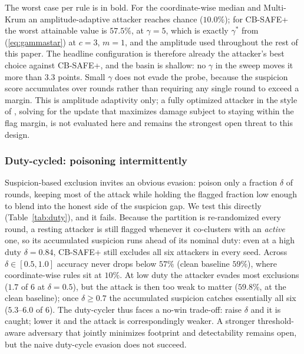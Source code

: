\documentclass[lettersize,journal]{IEEEtran}
\begin{document}
\noindent The worst case per rule is in bold. For the coordinate-wise median and
Multi-Krum an amplitude-adaptive attacker reaches chance ($10.0\%$); for CB-SAFE+ the
worst attainable value is $57.5\%$, at $\gamma{=}5$, which is exactly $\gamma^{*}$ from (\ref{eq:gammastar}) at $c{=}3$, $m{=}1$, and the amplitude used throughout
the rest of this paper. The headline configuration is therefore already the
attacker's best choice against CB-SAFE+, and the basin is shallow: no $\gamma$ in the
sweep moves it more than $3.3$ points. Small $\gamma$ does not evade the probe,
because the suspicion score accumulates over rounds rather than requiring any single
round to exceed a margin. This is amplitude adaptivity only; a fully optimized
attacker in the style of \cite{fang2020,shejwalkar2021,baruch2019}, solving for the
update that maximizes damage subject to staying within the flag margin, is not
evaluated here and remains the strongest open threat to this design.

\subsubsection{Duty-cycled: poisoning intermittently}
Suspicion-based exclusion invites an obvious evasion: poison only a fraction
$\delta$ of rounds, keeping most of the attack while holding the flagged fraction low
enough to blend into the honest side of the suspicion gap. We test this directly
(Table~\ref{tab:duty}), and it fails.
Because the partition is re-randomized every round, a resting attacker is still
flagged whenever it co-clusters with an \emph{active} one, so its accumulated
suspicion runs ahead of its nominal duty: even at a high duty $\delta{=}0.84$,
CB-SAFE+ still excludes all six attackers in every seed. Across
$\delta\in[0.5,1.0]$ accuracy never drops below $57\%$ (clean baseline $59\%$), where
coordinate-wise rules sit at $10\%$. At low duty the attacker evades most exclusions
($1.7$ of $6$ at $\delta{=}0.5$), but the attack is then too weak to matter
($59.8\%$, at the clean baseline); once $\delta{\geq}0.7$ the accumulated suspicion
catches essentially all six ($5.3$--$6.0$ of $6$). The
duty-cycler thus faces a no-win trade-off: raise $\delta$ and it is caught; lower it
and the attack is correspondingly weaker. A stronger
threshold-aware adversary that jointly minimizes footprint and detectability remains
open, but the naive duty-cycle evasion does not succeed.

\end{document}
